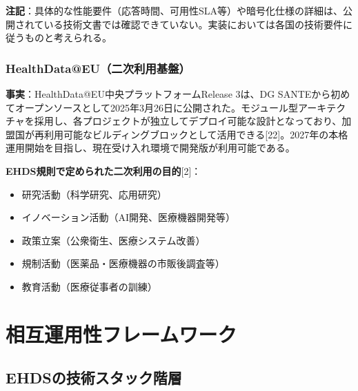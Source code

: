 \documentclass[
  a4paper,
  a4paper,
  11pt]{ltjsbook}
\providecommand{\tightlist}{%
  \setlength{\itemsep}{0pt}\setlength{\parskip}{0pt}}
\begin{document}
\begin{tcolorbox}[enhanced jigsaw, toprule=.15mm, bottomtitle=1mm, coltitle=black, left=2mm, opacityback=0, arc=.35mm, colbacktitle=quarto-callout-note-color!10!white, colback=white, opacitybacktitle=0.6, bottomrule=.15mm, rightrule=.15mm, breakable, title=\textcolor{quarto-callout-note-color}{\faInfo}\hspace{0.5em}{Note}, toptitle=1mm, titlerule=0mm, colframe=quarto-callout-note-color-frame, leftrule=.75mm]

\textbf{注記}：具体的な性能要件（応答時間、可用性SLA等）や暗号化仕様の詳細は、公開されている技術文書では確認できていない。実装においては各国の技術要件に従うものと考えられる。

\end{tcolorbox}

\subsubsection{HealthData@EU（二次利用基盤）}\label{healthdataeuux4e8cux6b21ux5229ux7528ux57faux76e4}

\textbf{事実}：HealthData@EU中央プラットフォームRelease 3は、DG
SANTEから初めてオープンソースとして2025年3月26日に公開された。モジュール型アーキテクチャを採用し、各プロジェクトが独立してデプロイ可能な設計となっており、加盟国が再利用可能なビルディングブロックとして活用できる{[}22{]}。2027年の本格運用開始を目指し、現在受け入れ環境で開発版が利用可能である。

\textbf{EHDS規則で定められた二次利用の目的}{[}2{]}：

\begin{itemize}
\tightlist
\item
  研究活動（科学研究、応用研究）
\item
  イノベーション活動（AI開発、医療機器開発等）
\item
  政策立案（公衆衛生、医療システム改善）
\item
  規制活動（医薬品・医療機器の市販後調査等）
\item
  教育活動（医療従事者の訓練）
\end{itemize}

\section{相互運用性フレームワーク}\label{ux76f8ux4e92ux904bux7528ux6027ux30d5ux30ecux30fcux30e0ux30efux30fcux30af}

\subsection{EHDSの技術スタック階層}\label{ehdsux306eux6280ux8853ux30b9ux30bfux30c3ux30afux968eux5c64}
\end{document}
